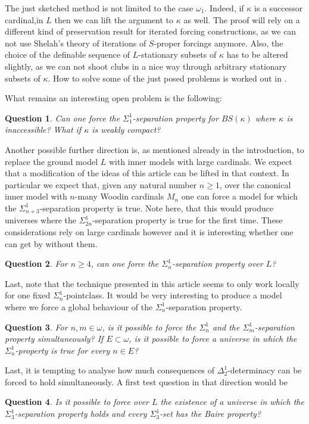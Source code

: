 \documentclass[a4paper,11pt]{article}
\newtheorem{question}{Question}
\begin{document}
The just sketched method is not limited to the case $\omega_1$. Indeed, if $\kappa$ is a successor cardinal,in $L$ then we can lift the argument to $\kappa$ as well. The proof will rely on a different kind of preservation result for iterated forcing constructions, as we can not use Shelah's theory of iterations of $S$-proper forcings anymore. Also, the choice of the definable sequence of $L$-stationary subsets of $\kappa$ has to be altered slightly, as we can not shoot clubs in a nice way through arbitrary stationary subsets of $\kappa$. How to solve some of the just posed problems is worked out in \cite{SyLL}.

What remains an interesting open problem is the following:
\begin{question}
Can one force the $\Sigma^1_{1}$-separation property for $BS(\kappa)$ where $\kappa$ is inaccessible? What if $\kappa$ is weakly compact?
\end{question}

Another possible further direction is, as mentioned already in the introduction, to replace the ground model $L$ with inner models with large cardinals.
We expect that a modification of the ideas of this article can be lifted in that context. In particular we expect that, given any natural number $n \ge 1$, over the canonical inner model with $n$-many Woodin cardinals $M_n$ one can force a model for which the $\Sigma^1_{n+3}$-separation property is true.
Note here, that this would produce universes where the $\Sigma^1_{2n}$-separation property is true for the first time.
These considerations rely on large cardinals however and it is interesting whether one can get by without them.

\begin{question}
For $n \ge 4$, can one force the  $\Sigma^1_n$-separation property over $L$?
\end{question}
Last, note that the technique presented in this article seems to only work locally for one fixed $\Sigma^1_n$-pointclass. It would be very interesting to produce a model where we force a global behaviour of the $\Sigma^1_n$-separation property.

\begin{question}
For $n,m \in \omega$, is it possible to force the $\Sigma^1_n$ and the $\Sigma^1_m$-separation property simultaneously?
If $E \subset \omega$, is it possible to force a universe in which the $\Sigma^1_n$-property is true for every $n \in E$?
\end{question}
Last, it is tempting to analyse how much consequences of $\Delta^1_2$-determinacy can be forced to hold simultaneously.
A first test question in that direction would be
\begin{question}
Is it possible to force over $L$ the existence of a universe in which the $\Sigma^1_3$-separation property holds and every $\Sigma^1_3$-set has the Baire property? 
\end{question}
\end{document}
